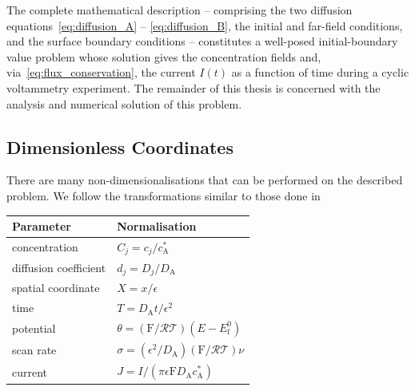 The complete mathematical description -- comprising the two diffusion
equations~\eqref{eq:diffusion_A} -- \eqref{eq:diffusion_B}, the initial and
far-field conditions, and the surface boundary conditions -- constitutes a
well-posed initial-boundary value problem whose solution gives the
concentration fields and, via~\eqref{eq:flux_conservation}, the current
$I(t)$ as a function of time during a cyclic voltammetry experiment. The
remainder of this thesis is concerned with the analysis and numerical
solution of this problem.

\subsection{Dimensionless Coordinates}

There are many non-dimensionalisations that can be performed on the
described problem. We follow the transformations similar to those done
in \cite{compton2014understanding}

\begin{tabular}{ll}
  \hline Parameter & Normalisation \\
  \hline concentration & $C_j=c_j / c_{\mathrm{A}}^*$ \\
  diffusion coefficient & $d_j=D_j / D_{\mathrm{A}}$ \\
  spatial coordinate & $X=x / \epsilon$ \\
  time & $T=D_{\mathrm{A}} t / \epsilon^2$ \\
  potential & $\theta=(\mathrm{F} / \mathcal{R}
  \mathcal{T})\left(E-E_{\mathrm{f}}^0\right)$ \\
  scan rate & $\sigma=\left(\epsilon^2 /
  D_{\mathrm{A}}\right)(\mathrm{F} / \mathcal{R} \mathcal{T}) \nu$ \\
  current & $J=I /\left(\pi \epsilon \mathrm{F} D_{\mathrm{A}}
  c_{\mathrm{A}}^*\right)$ \\
  \hline
\end{tabular}
